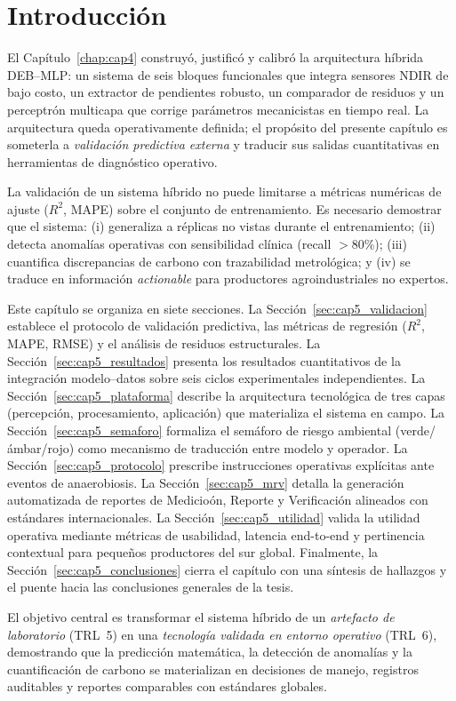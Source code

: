 \section{Introducción}
\label{sec:cap5_introduccion}

El Capítulo~\ref{chap:cap4} construyó, justificó y calibró la arquitectura híbrida DEB--MLP: un sistema de seis bloques funcionales que integra sensores NDIR de bajo costo, un extractor de pendientes robusto, un comparador de residuos y un perceptrón multicapa que corrige parámetros mecanicistas en tiempo real. La arquitectura queda operativamente definida; el propósito del presente capítulo es someterla a \emph{validación predictiva externa} y traducir sus salidas cuantitativas en herramientas de diagnóstico operativo.

La validación de un sistema híbrido no puede limitarse a métricas numéricas de ajuste ($R^2$, MAPE) sobre el conjunto de entrenamiento. Es necesario demostrar que el sistema: (i) generaliza a réplicas no vistas durante el entrenamiento; (ii) detecta anomalías operativas con sensibilidad clínica (recall $> 80$\%); (iii) cuantifica discrepancias de carbono con trazabilidad metrológica; y (iv) se traduce en información \emph{actionable} para productores agroindustriales no expertos.

Este capítulo se organiza en siete secciones. La Sección~\ref{sec:cap5_validacion} establece el protocolo de validación predictiva, las métricas de regresión ($R^2$, MAPE, RMSE) y el análisis de residuos estructurales. La Sección~\ref{sec:cap5_resultados} presenta los resultados cuantitativos de la integración modelo--datos sobre seis ciclos experimentales independientes. La Sección~\ref{sec:cap5_plataforma} describe la arquitectura tecnológica de tres capas (percepción, procesamiento, aplicación) que materializa el sistema en campo. La Sección~\ref{sec:cap5_semaforo} formaliza el semáforo de riesgo ambiental (verde/ámbar/rojo) como mecanismo de traducción entre modelo y operador. La Sección~\ref{sec:cap5_protocolo} prescribe instrucciones operativas explícitas ante eventos de anaerobiosis. La Sección~\ref{sec:cap5_mrv} detalla la generación automatizada de reportes de Medicioón, Reporte y Verificación alineados con estándares internacionales. La Sección~\ref{sec:cap5_utilidad} valida la utilidad operativa mediante métricas de usabilidad, latencia end-to-end y pertinencia contextual para pequeños productores del sur global. Finalmente, la Sección~\ref{sec:cap5_conclusiones} cierra el capítulo con una síntesis de hallazgos y el puente hacia las conclusiones generales de la tesis.

El objetivo central es transformar el sistema híbrido de un \emph{artefacto de laboratorio} (TRL~5) en una \emph{tecnología validada en entorno operativo} (TRL~6), demostrando que la predicción matemática, la detección de anomalías y la cuantificación de carbono se materializan en decisiones de manejo, registros auditables y reportes comparables con estándares globales.
